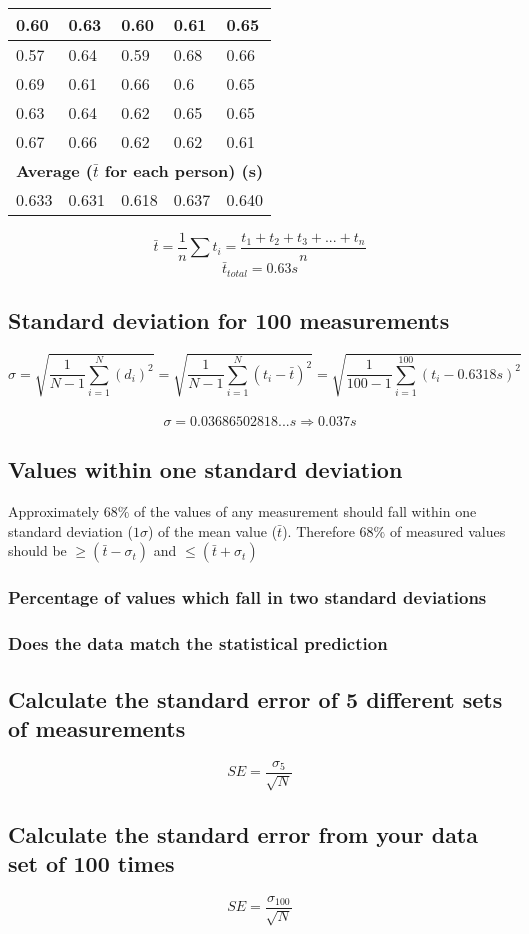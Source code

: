 \documentclass[11pt, letterpaper, includehead]{article}
\begin{document}
\begin{center}
\begin{tabular}{|  m{2cm} | m{2cm} | m{2cm} | m{2cm} | m{2cm} | }
    \hline
    0.60          & 0.63           & 0.60         & 0.61           & 0.65          \\
    \hline
    0.57          & 0.64           & 0.59         & 0.68           & 0.66          \\
    \hline
    0.69          & 0.61           & 0.66         & 0.6            & 0.65          \\
    \hline
    0.63          & 0.64           & 0.62         & 0.65           & 0.65          \\
    \hline
    0.67          & 0.66           & 0.62         & 0.62           & 0.61          \\
    \hline\hline
    \multicolumn{5}{|c|}{\textbf{Average ($\bar{t}$ for each person) (s)}} \\
    \hline
    0.633         & 0.631          & 0.618        & 0.637          & 0.640         \\
    \hline
  \end{tabular}
\end{center}
$$\bar{t} = \frac{1}{n}\sum t_i = \frac{t_1 + t_2 + t_3 + ... + t_n}{n}$$
$$\bar{t}_{total} = \boxed{0.63s}$$

\subsection{Standard deviation for 100 measurements} %
$$\sigma = \sqrt{\frac{1}{N - 1}\sum_{i = 1}^{N} (d_i)^2} = \sqrt{\frac{1}{N - 1}\sum_{i = 1}^{N} (t_i - \bar{t})^2}= \sqrt{\frac{1}{100 - 1}\sum_{i = 1}^{100}(t_i - 0.6318s)^2}$$\\
$$\sigma = 0.03686502818...s \Rightarrow \boxed{0.037s}$$

\subsection{Values within one standard deviation} %
Approximately $68\%$ of the values of any measurement should fall within one
standard deviation ($1 \sigma$) of the mean value ($\bar{t}$). Therefore $68\%$ of measured
values should be $\geq (\bar{t} - \sigma_t)$ and $\leq (\bar{t} + \sigma_t)$

\subsubsection{Percentage of values which fall in two standard deviations}

\subsubsection{Does the data match the statistical prediction}

\subsection{Calculate the standard error of 5 different sets of measurements}

$$SE = \frac{\sigma_{5}}{\sqrt{N}}$$


\subsection{Calculate the standard error from your data set of 100 times}


$$SE = \frac{\sigma_{100}}{\sqrt{N}}$$
\end{document}
